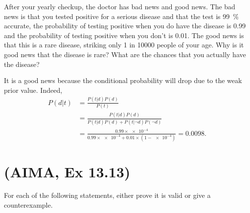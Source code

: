 \documentclass[11pt, a4paper]{article}
\begin{document}
After your yearly checkup, the doctor has bad news and good news. The bad news is that you tested positive for a serious disease and that the test is \qty{99}{\percent} accurate, \ie{} the probability of testing positive when you do have the disease is \num{0.99} and the probability of testing positive when you don't is \num{0.01}. The good news is that this is a rare disease, striking only 1 in \num{10000} people of your age. Why is it good news that the disease is rare? What are the chances that you actually have the disease?

\begin{solution}
    It is a good news because the conditional probability will drop due to the weak prior value. Indeed,
    \begin{align*}
        P(d | t) & = \frac{P(t | d) P(d)}{P(t)} \\
        & = \frac{P(t | d) P(d)}{P(t | d) P(d) + P(t | \neg d) P(\neg d)} \\
        & = \frac{0.99 \times \num{e-4}}{0.99 \times \num{e-4} + 0.01 \times (1 - \num{e-4})} = \num{0.0098} .
    \end{align*}
\end{solution}

\newpage

\section{(AIMA, Ex 13.13)}

For each of the following statements, either prove it is valid or give a counterexample.
\end{document}
